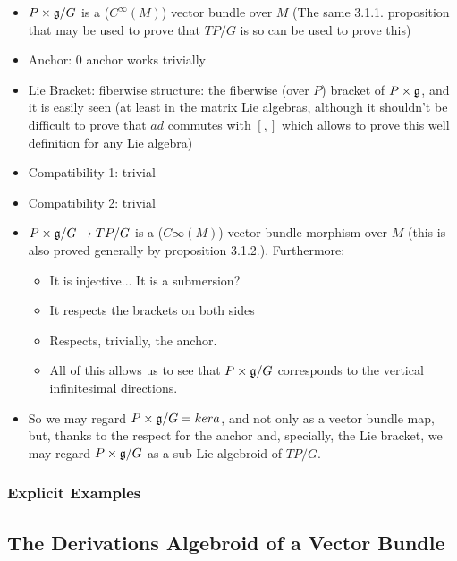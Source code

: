     \begin{itemize}
    \item $P \times \mathfrak{g}/G$ is a ($C^\infty(M)$) vector bundle over $M$ (The same 3.1.1. proposition that may be used to prove that $TP/G$ is so can be used to prove this)
    
    \item Anchor: $0$ anchor works trivially
    
    \item Lie Bracket: fiberwise structure: the fiberwise (over $P$) bracket of $P \times \mathfrak{g}$, and it is easily seen (at least in the matrix Lie algebras, although it shouldn't be difficult to prove that $ad$ commutes with $[,]$ which allows to prove this well definition for any Lie algebra)
    
    \item Compatibility 1: trivial
    
    \item Compatibility 2: trivial
    
    \item $P \times \mathfrak{g}/ G \to TP / G$ is a ($C\infty(M)$) vector bundle morphism over $M$ (this is also proved generally by proposition 3.1.2.). Furthermore:
        \begin{itemize}
        \item It is injective... It is a submersion?
        \item It respects the brackets on both sides
        \item Respects, trivially, the anchor.
        \item All of this allows us to see that $P \times \mathfrak{g}/G$ corresponds to the vertical infinitesimal directions.
        \end{itemize}
    
    \item So we may regard $P \times \mathfrak{g} / G = ker a$, and not only as a vector bundle map, but, thanks to the respect for the anchor and, specially, the Lie bracket, we may regard $P \times \mathfrak{g}/G$ as a sub Lie algebroid of $TP/G$.
    \end{itemize}

\subsubsection{Explicit Examples}

\subsection{The Derivations Algebroid of a Vector Bundle}

